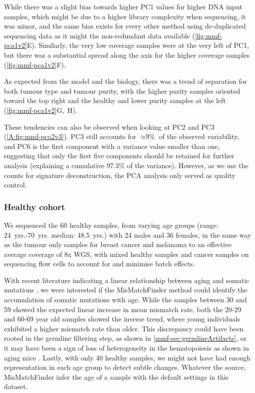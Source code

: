 While there was a slight bias towards higher PC1 values for higher DNA input samples, which might be due to a higher library complexity when sequencing, it was minor, and the same bias exists for every other method using de-duplicated sequencing data as it might  the non-redundant data available (\autoref{fig:mmf-pca1v2}E). Similarly, the very low coverage samples were at the very left of PC1, but there was a substantial spread along the axis for the higher coverage samples (\autoref{fig:mmf-pca1v2}F). 

As expected from the model and the biology, there was a trend of separation for both tumour type and tumour purity, with the higher purity samples oriented toward the top right and the healthy and lower purity samples at the left (\autoref{fig:mmf-pca1v2}G,~H).

These tendencies can also be observed when looking at PC2 and PC3 (\autoref{A:fig:mmf-pca2v3}). PC3 still accounts for $\approx \text{9\%}$ of the observed variability, and PC6 is the first component with a variance value smaller than one, suggesting that only the first five components should be retained for further analysis (explaining a cumulative 97.3\% of the variance). However, as we use the counts for signature deconstruction, the PCA analysis only served as quality control.


\subsubsection{Healthy cohort}
\label{mmf-sec:healthy}

We sequenced the 60 healthy samples, from varying age groups (range: \num{24}~yrs.-\num{70}~yrs. median: \num{48.5}~yrs.) with 24 males and 36 females, in the same way as the tumour only samples for breast cancer and melanoma to an effective average coverage of 8x WGS, with mixed healthy samples and cancer samples on sequencing flow cells to account for and minimise batch effects.

With recent literature indicating a linear relationship between aging and somatic mutations \cite{Martincorena2018,Abascal2021,Cagan2022}, we were interested if the MisMatchFinder method could identify the accumulation of  somatic mutations with age. While the samples between 30 and 59 showed the expected linear increase in mean mismatch rate, both the 20-29 and 60-69 year old samples showed the inverse trend, where young individuals exhibited a higher mismatch rate than older. This discrepancy could have been rooted in the germline filtering step, as shown in \autoref{mmf-sec:germlineArtifacts}, or it may have been a sign of loss of heterogeneity in the hematopoiesis as shown in aging mice \cite{Ganuza2019}. Lastly, with only 40 healthy samples, we might not have had enough representation in each age group to detect subtle changes. Whatever the source, MisMatchFinder  infer the age of a sample with the default settings in this dataset.

